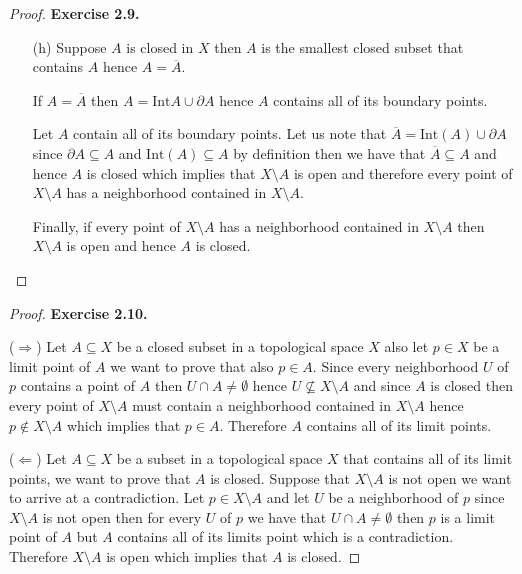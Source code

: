 \documentclass[11pt]{article}
\newcommand{\inter}{\text{Int}}
\newcommand{\setmin}{\setminus}
\theoremstyle{definition}
\begin{document}
\begin{proof}{\textbf{Exercise 2.9.}}
\begin{itemize}
        \item [(h)]
        Suppose $A$ is closed in $X$ then $A$ is the smallest closed subset
        that contains $A$ hence $A = \overline{A}$.

        If $A = \overline{A}$ then $A = \inter{A} \cup \partial A$ hence $A$
        contains all of its boundary points.

        Let $A$ contain all of its boundary points. Let us note that
        $\overline{A} = \inter(A) \cup \partial A$ since
        $\partial A \subseteq A$ and $\inter(A) \subseteq A$ by definition
        then we have that $\overline{A} \subseteq A$ and hence
        $A$ is closed which implies that $X \setmin A$ is open and
        therefore every point of $X \setmin A$ has a neighborhood contained in
        $X \setmin A$. 

        Finally, if every point of $X \setmin A$ has a neighborhood contained
        in $X \setmin A$ then $X \setmin A$ is open and hence $A$ is closed.
    \end{itemize}
\end{proof}
\cleardoublepage
\begin{proof}{\textbf{Exercise 2.10.}}
    
    ($\Rightarrow$) Let $A \subseteq X$ be a closed subset in a topological space
    $X$ also let $p \in X$ be a limit point of $A$ we want to prove that also
    $p \in A$. Since every neighborhood $U$ of $p$ contains a point of $A$ then
    $U \cap A \neq \emptyset$ hence $U \not\subseteq X \setmin A$
    and since $A$ is closed then every point of $X \setmin A$ must contain a
    neighborhood contained in $X \setmin A$ hence $p \not\in X \setmin A$
    which implies that $p \in A$. Therefore $A$ contains all of its
    limit points.
    
    ($\Leftarrow$) Let $A \subseteq X$ be a subset in a topological space
    $X$ that contains all of its limit points, we want to prove that $A$ is
    closed. Suppose that $X \setmin A$ is not open we want to arrive at a
    contradiction. Let $p \in X \setmin A$ and let $U$ be a neighborhood of
    $p$ since $X \setmin A$ is not open then for every $U$ of $p$ we have that
    $U \cap A \neq \emptyset$ then $p$ is a limit point of $A$
    but $A$ contains all of its limits point which is a contradiction.
    Therefore $X \setmin A$ is open which implies that $A$ is closed.
    
\end{proof}
\end{document}
